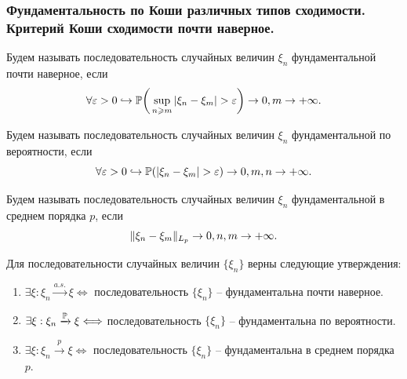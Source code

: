 \subsubsection{Фундаментальность по Коши различных типов сходимости. Критерий Коши сходимости почти наверное.}
\begin{definition}
    Будем называть последовательность случайных величин $\xi_n$ фундаментальной почти наверное, если
    \[
        \forall \epsilon > 0 \hookrightarrow \P\biggr(\sup\limits_{n \geq m}|\xi_n - \xi_m| > \epsilon\biggr) \ra 0, m \ra +\infty.
    \]
\end{definition}
\begin{definition}
    Будем называть последовательность случайных величин $\xi_n$ фундаментальной по вероятности, если
    \[
        \forall \epsilon > 0 \hookrightarrow \P(|\xi_n - \xi_m| > \epsilon) \ra 0, m, n \ra +\infty.
    \]
\end{definition}
\begin{definition}
    Будем называть последовательность случайных величин $\xi_n$ фундаментальной в среднем порядка $p$, если
    \[
        \|\xi_n - \xi_m\|_{L_p} \ra 0, n, m \ra +\infty.
    \]
\end{definition}
\begin{theorem}
    Для последовательности случайных величин $\{\xi_n\}$ верны следующие утверждения:
    \begin{enumerate}
        \item $\exists \xi: \xi_n \xrightarrow{a.s.} \xi \Longleftrightarrow$ последовательность $\{\xi_n\}$ -- фундаментальна почти наверное.
        \item $\exists \xi: \xi_n \xrightarrow{\P} \xi \Longleftrightarrow$ последовательность $\{\xi_n\}$ -- фундаментальна по вероятности.
        \item $\exists \xi: \xi_n \xrightarrow{p} \xi \Longleftrightarrow$ последовательность $\{\xi_n\}$ -- фундаментальна в среднем порядка $p$.
    \end{enumerate}
\end{theorem}
